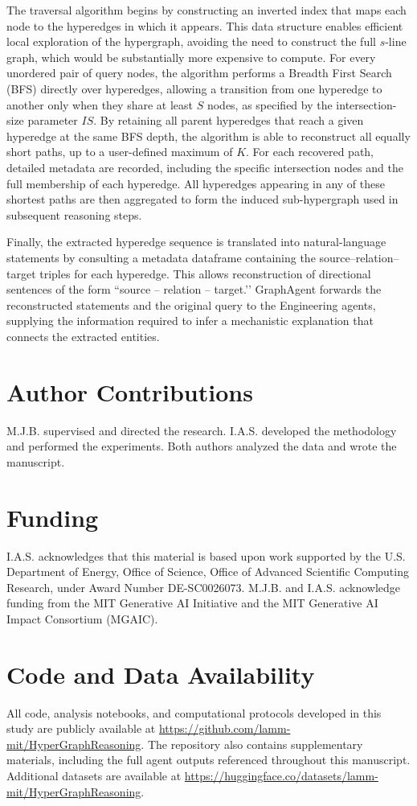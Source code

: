 \documentclass{article}
\begin{document}
The traversal algorithm begins by constructing an inverted index that maps each node to the hyperedges in which it appears. This data structure enables efficient local exploration of the hypergraph, avoiding the need to construct the full $s$-line graph, which would be substantially more expensive to compute. For every unordered pair of query nodes, the algorithm performs a Breadth First Search (BFS) directly over hyperedges, allowing a transition from one hyperedge to another only when they share at least $S$ nodes, as specified by the intersection-size parameter $IS$. By retaining all parent hyperedges that reach a given hyperedge at the same BFS depth, the algorithm is able to reconstruct all equally short paths, up to a user-defined maximum of $K$. For each recovered path, detailed metadata are recorded, including the specific intersection nodes and the full membership of each hyperedge. All hyperedges appearing in any of these shortest paths are then aggregated to form the induced sub-hypergraph used in subsequent reasoning steps.

Finally, the extracted hyperedge sequence is translated into natural-language statements by consulting a metadata dataframe containing the source--relation--target triples for each hyperedge. This allows reconstruction of directional sentences of the form ``source -- relation -- target.’’ GraphAgent forwards the reconstructed statements and the original query to the Engineering agents, supplying the information required to infer a mechanistic explanation that connects the extracted entities.


\section*{Author Contributions}
M.J.B. supervised and directed the research. I.A.S. developed the methodology and performed the experiments. Both authors analyzed the data and wrote the manuscript.

\section*{Funding}
I.A.S. acknowledges that this material is based upon work supported by the U.S. Department of Energy, Office of Science, Office of Advanced Scientific Computing Research, under Award Number DE-SC0026073. M.J.B. and I.A.S. acknowledge funding from the MIT Generative AI Initiative and the MIT Generative AI Impact Consortium (MGAIC). 

\section*{Code and Data Availability}
All code, analysis notebooks, and computational protocols developed in this study are publicly available at \url{https://github.com/lamm-mit/HyperGraphReasoning}. The repository also contains supplementary materials, including the full agent outputs referenced throughout this manuscript. Additional datasets are available at \url{https://huggingface.co/datasets/lamm-mit/HyperGraphReasoning}.
\end{document}
